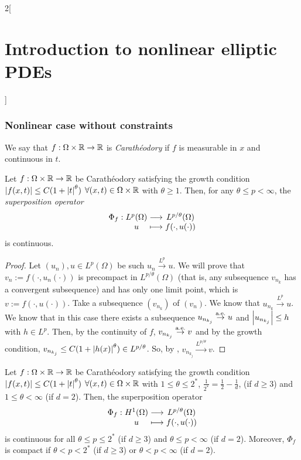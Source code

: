 \documentclass[../../../main_math.tex]{subfiles}
\begin{document}
\begin{multicols}{2}[\section{Introduction to nonlinear elliptic PDEs}]
  \subsubsection{Nonlinear case without constraints}
  \begin{definition}
    We say that $f:\Omega\times \mathbb{R}\to\mathbb{R}$ is \emph{Carathéodory} if $f$ is measurable in $x$ and continuous in $t$.
  \end{definition}
  \begin{theorem}
    Let $f:\Omega\times \mathbb{R}\to\mathbb{R}$ be Carathéodory satisfying the growth condition $\abs{f(x,t)}\leq C(1+\abs{t}^\theta)$ $\forall (x,t)\in \Omega\times \mathbb{R}$ with $\theta\geq 1$. Then, for any $\theta\leq p<\infty$, the \emph{superposition operator}
    $$
      \function{\Phi_f}{L^p(\Omega)}{L^{p/\theta}(\Omega)}{u}{f(\cdot,u(\cdot))}
    $$
    is continuous.
  \end{theorem}
  \begin{proof}
    Let $(u_n),u\in L^p(\Omega)$ be such $u_n\overset{L^p}{\longrightarrow} u$. We will prove that $v_n:=f(\cdot,u_n(\cdot))$ is precompact in $L^{p/\theta}(\Omega)$ (that is, any subsequence $v_{n_k}$ has a convergent subsequence) and has only one limit point, which is $v:=f(\cdot,u(\cdot))$. Take a subsequence $(v_{n_k})$ of $(v_n)$. We know that $u_{n_k}\overset{L^p}{\longrightarrow} u$. We know that in this case there exists a subsequence $u_{n_{k_j}}\overset{\text{a.e.}}{\to }u$ and $\abs{u_{n_{k_j}}}\leq h$ with $h\in L^p$. Then, by the continuity of $f$, $v_{n_{k_j}}\overset{\text{a.e.}}{\to} v$ and by the growth condition, $v_{n_{k_j}}\leq C(1+\abs{h(x)}^\theta)\in L^{p/\theta}$. So, by , $v_{n_{k_j}}\overset{L^{p/\theta}}{\longrightarrow} v$.
  \end{proof}
  \begin{proposition}\label{INEPDE:minimization_prop1}
    Let $f:\Omega\times \mathbb{R}\to\mathbb{R}$ be Carathéodory satisfying the growth condition $\abs{f(x,t)}\leq C(1+\abs{t}^\theta)$ $\forall (x,t)\in \Omega\times \mathbb{R}$ with $1\leq \theta\leq 2^*$, $\frac{1}{2^*}=\frac{1}{2}-\frac{1}{d}$, (if $d\geq 3$) and $1\leq \theta<\infty$ (if $d=2$). Then, the superposition operator
    $$
      \function{\Phi_f}{H^1(\Omega)}{L^{p/\theta}(\Omega)}{u}{f(\cdot,u(\cdot))}
    $$
    is continuous for all $\theta \leq p\leq 2^*$ (if $d\geq 3$) and $\theta\leq p<\infty$ (if $d=2$). Moreover, $\Phi_f$ is compact if $\theta<p<2^*$ (if $d\geq 3$) or $\theta<p<\infty$ (if $d=2$).
  \end{proposition}
  \begin{definition}

\end{definition}
\end{multicols}
\end{document}
